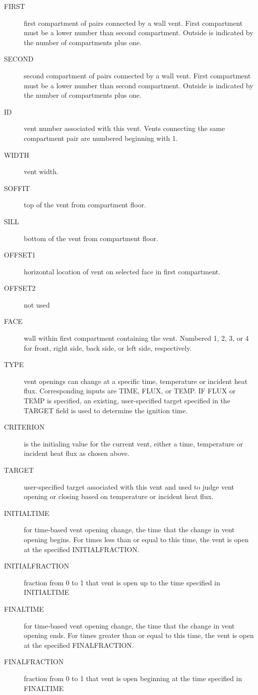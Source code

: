 \begin{adjustwidth}{1cm}{0cm}
\begin{description}
  \item[FIRST] first compartment of pairs connected by a wall vent. First compartment must be a lower number than second compartment. Outside is indicated by the number of compartments plus one.
  \item[SECOND] second compartment of pairs connected by a wall vent. First compartment must be a lower number than second compartment. Outside is indicated by the number of compartments plus one.
  \item[ID] vent number associated with this vent. Vents connecting the same compartment pair are numbered beginning with 1.
  \item[WIDTH] vent width.
  \item[SOFFIT] top of the vent from compartment floor.
  \item[SILL] bottom of the vent from compartment floor.
  \item[OFFSET1] horizontal location of vent on selected face in first compartment.
  \item[OFFSET2] not used
  \item[FACE] wall within first compartment containing the vent. Numbered 1, 2, 3, or 4 for front, right side, back side, or left side, respectively.
  \item[TYPE] vent openings can change at a specific time, temperature or incident heat flux. Corresponding inputs are TIME, FLUX, or TEMP.  IF FLUX or TEMP is specified, an existing, user-specified target specified in the TARGET field is used to determine the ignition time.
  \item[CRITERION] is the initialing value for the current vent, either a time, temperature or incident heat flux as chosen above.
  \item[TARGET] user-specified target associated with this vent and used to judge vent opening or closing based on temperature or incident heat flux.
  \item[INITIALTIME] for time-based vent opening change, the time that the change in vent opening begins. For times less than or equal to this time, the vent is open at the specified INITIALFRACTION.
  \item[INITIALFRACTION] fraction from 0 to 1 that vent is open up to the time specified in INITIALTIME
  \item[FINALTIME] for time-based vent opening change, the time that the change in vent opening ends. For times greater than or equal to this time, the vent is open at the specified FINALFRACTION.
  \item[FINALFRACTION] fraction from 0 to 1 that vent is open beginning at the time specified in FINALTIME
\end{description}
\end{adjustwidth}

